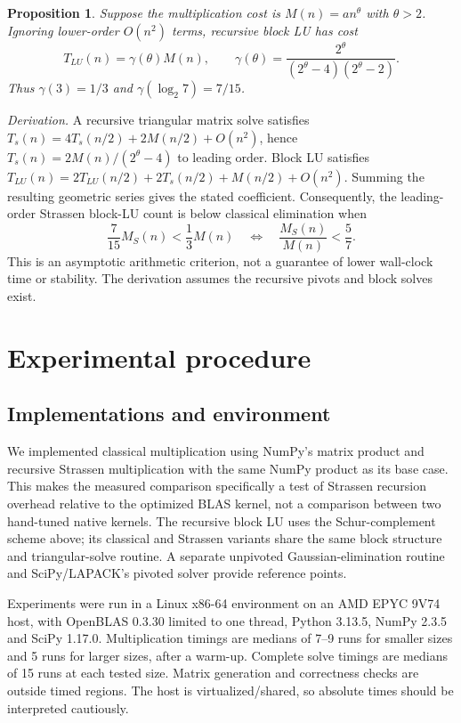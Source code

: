 \documentclass[9pt,a4paper]{article}
\newtheorem{proposition}{Proposition}
\begin{document}
\begin{proposition}
Suppose the multiplication cost is $M(n)=a n^\theta$ with $\theta>2$. Ignoring lower-order $O(n^2)$ terms, recursive block LU has cost
\[
T_{LU}(n)=\gamma(\theta)M(n),\qquad
\gamma(\theta)=\frac{2^\theta}{(2^\theta-4)(2^\theta-2)}.
\]
Thus $\gamma(3)=1/3$ and $\gamma(\log_2 7)=7/15$.
\end{proposition}
\noindent\textit{Derivation.} A recursive triangular matrix solve satisfies $T_s(n)=4T_s(n/2)+2M(n/2)+O(n^2)$, hence $T_s(n)=2M(n)/(2^\theta-4)$ to leading order. Block LU satisfies $T_{LU}(n)=2T_{LU}(n/2)+2T_s(n/2)+M(n/2)+O(n^2)$. Summing the resulting geometric series gives the stated coefficient. Consequently, the leading-order Strassen block-LU count is below classical elimination when
\begin{equation}
\frac{7}{15}M_S(n)<\frac13M(n)
\quad\Longleftrightarrow\quad \frac{M_S(n)}{M(n)}<\frac57.
\tag{3}
\end{equation}
This is an asymptotic arithmetic criterion, not a guarantee of lower wall-clock time or stability. The derivation assumes the recursive pivots and block solves exist.

\newpage
\section{Experimental procedure}
\subsection{Implementations and environment}
We implemented classical multiplication using NumPy's matrix product and recursive Strassen multiplication with the same NumPy product as its base case. This makes the measured comparison specifically a test of Strassen recursion overhead relative to the optimized BLAS kernel, not a comparison between two hand-tuned native kernels. The recursive block LU uses the Schur-complement scheme above; its classical and Strassen variants share the same block structure and triangular-solve routine. A separate unpivoted Gaussian-elimination routine and SciPy/LAPACK's pivoted solver provide reference points.

Experiments were run in a Linux x86-64 environment on an AMD EPYC 9V74 host, with OpenBLAS 0.3.30 limited to one thread, Python 3.13.5, NumPy 2.3.5 and SciPy 1.17.0. Multiplication timings are medians of 7--9 runs for smaller sizes and 5 runs for larger sizes, after a warm-up. Complete solve timings are medians of 15 runs at each tested size. Matrix generation and correctness checks are outside timed regions. The host is virtualized/shared, so absolute times should be interpreted cautiously.
\end{document}
